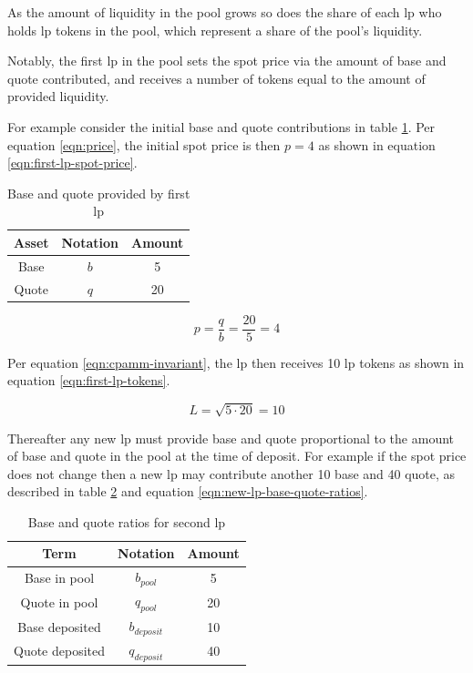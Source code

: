 \documentclass[table, twocolumn]{article}
\begin{document}
As the amount of liquidity in the pool grows so does the share of each \gls{lp} who holds \gls{lp}
tokens in the pool, which represent a share of the pool's liquidity.

Notably, the first \gls{lp} in the pool sets the spot price via the amount of base and quote
contributed, and receives a number of tokens equal to the amount of provided liquidity.

For example consider the initial base and quote contributions in table \ref{tab:first-lp-amounts}.
Per equation \ref{eqn:price}, the initial spot price is then $p = 4$ as shown in equation
\ref{eqn:first-lp-spot-price}.

\begin{table}[!htb]
  \centering
  \begin{tabular}{|c|c|c|}
    \hline \rowcolor{blue}
    Asset & Notation & Amount \\ \hline
    Base  & $b$      & 5      \\ \hline
    Quote & $q$      & 20     \\ \hline
  \end{tabular}
  \caption{Base and quote provided by first \gls{lp}}
  \label{tab:first-lp-amounts}
\end{table}

\begin{equation} \label{eqn:first-lp-spot-price}
  p = \frac{q}{b} = \frac{20}{5} = 4
\end{equation}

Per equation \ref{eqn:cpamm-invariant}, the \gls{lp} then receives 10 \gls{lp} tokens as shown in
equation \ref{eqn:first-lp-tokens}.

\begin{equation} \label{eqn:first-lp-tokens}
  L = \sqrt{5 \cdot 20} = 10
\end{equation}

Thereafter any new \gls{lp} must provide base and quote proportional to the amount of base and quote
in the pool at the time of deposit. For example if the spot price does not change then a new
\gls{lp} may contribute another 10 base and 40 quote, as described in table
\ref{tab:new-lp-base-quote-ratios} and equation \ref{eqn:new-lp-base-quote-ratios}.

\begin{table}[!htb]
  \centering
  \begin{tabular}{|c|c|c|}
    \hline \rowcolor{blue}
    Term            & Notation      & Amount \\ \hline
    Base in pool    & $b_{pool}$    & 5      \\ \hline
    Quote in pool   & $q_{pool}$    & 20     \\ \hline
    Base deposited  & $b_{deposit}$ & 10     \\ \hline
    Quote deposited & $q_{deposit}$ & 40     \\ \hline
  \end{tabular}
  \caption{Base and quote ratios for second \gls{lp}}
  \label{tab:new-lp-base-quote-ratios}
\end{table}
\end{document}
